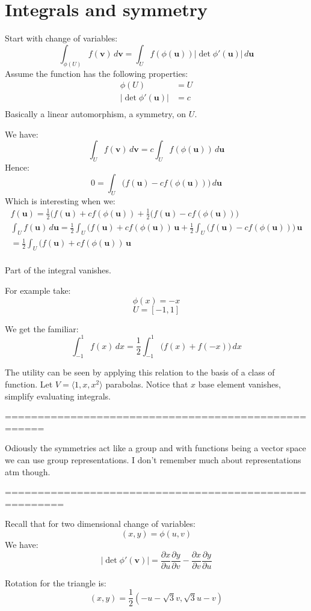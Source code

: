 
\section{Integrals and symmetry}
Start with change of variables:
\[\int_{\phi(U)}f(\mathbf{v})\,d\mathbf{v} = \int_Uf(\phi(\mathbf{u}))|\det\phi'(\mathbf{u})|\,d\mathbf{u}\]
Assume the function has the following properties:
\begin{equation*}
\begin{aligned}
	\phi(U) &= U \\
	|\det\phi'(\mathbf{u})| &= c \\
\end{aligned}
\end{equation*}
Basically a linear automorphism, a symmetry, on $U$.

We have:
\[\int_{U}f(\mathbf{v})\,d\mathbf{v} = c\int_Uf(\phi(\mathbf{u}))\,d\mathbf{u}\]
Hence:
\[0=\int_{U}\big(f(\mathbf{u})-cf(\phi(\mathbf{u}))\big)\,d\mathbf{u}\]
Which is interesting when we:
\begin{equation*}
\begin{aligned}
f(\mathbf{u}) = \frac{1}{2}\big(f(\mathbf{u})+cf(\phi(\mathbf{u}))+\frac{1}{2}\big(f(\mathbf{u})-cf(\phi(\mathbf{u}))\big) \\
\int_Uf(\mathbf{u})\,d\mathbf{u} = \frac{1}{2}\int_U\big(f(\mathbf{u})+cf(\phi(\mathbf{u}))\,\mathbf{u}+\frac{1}{2}\int_U\big(f(\mathbf{u})-cf(\phi(\mathbf{u}))\big)\,\mathbf{u} \\
= \frac{1}{2}\int_U\big(f(\mathbf{u})+cf(\phi(\mathbf{u}))\,\mathbf{u}\\
\end{aligned}
\end{equation*}

Part of the integral vanishes.

For example take:
\[\phi(x) = -x \]
\[U = [-1,1]\]

We get the familiar:
\[\int_{-1}^{1}f(x)\,dx = \frac{1}{2}\int_{-1}^{1}\big(f(x)+f(-x)\big)\,dx\]

The utility can be seen by applying this relation to the basis of a class of function.
Let $V = \langle 1,x,x^2 \rangle$ parabolas.
Notice that $x$ base element vanishes, simplify evaluating integrals.

====================================================

Odiously the symmetries act like a group and with functions being a vector space we can use group representations.
I don't remember much about representations atm though.

=======================================================

Recall that for two dimensional change of variables:
\[ (x,y) = \phi(u,v) \]
We have:
\[|\det\phi'(\mathbf{v})| = \frac{\partial x}{\partial u}\frac{\partial y}{\partial v} - \frac{\partial x}{\partial v}\frac{\partial y}{\partial u} \]

Rotation for the triangle is:
\[(x,y) = \frac{1}{2}(-u-\sqrt{3}v,\sqrt{3}u-v)\]


